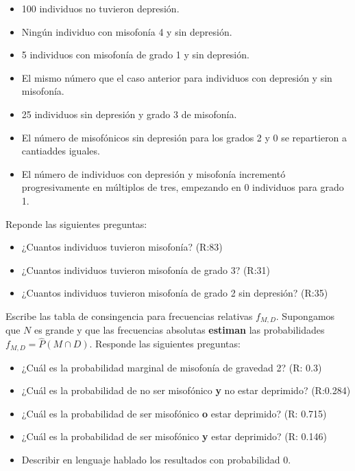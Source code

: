 \documentclass[
]{book}
\providecommand{\tightlist}{%
  \setlength{\itemsep}{0pt}\setlength{\parskip}{0pt}}
\begin{document}
\begin{itemize}
\tightlist
\item
  100 individuos no tuvieron depresión.
\item
  Ningún individuo con misofonía 4 y sin depresión.
\item
  5 individuos con misofonía de grado 1 y sin depresión.
\item
  El mismo número que el caso anterior para individuos con depresión y sin misofonía.
\item
  25 individuos sin depresión y grado 3 de misofonía.
\item
  El número de misofónicos sin depresión para los grados 2 y 0 se repartieron a cantiaddes iguales.
\item
  El número de individuos con depresión y misofonía incrementó progresivamente
  en múltiplos de tres, empezando en 0 individuos para grado 1.
\end{itemize}

Reponde las siguientes preguntas:

\begin{itemize}
\tightlist
\item
  ¿Cuantos individuos tuvieron misofonía? (R:83)
\item
  ¿Cuantos individuos tuvieron misofonía de grado 3? (R:31)
\item
  ¿Cuantos individuos tuvieron misofonía de grado 2 sin depresión? (R:35)
\end{itemize}

Escribe las tabla de consingencia para frecuencias relativas \(f_{M,D}\). Supongamos que \(N\) es grande y que las frecuencias absolutas \textbf{estiman} las probabilidades \(f_{M,D}=\hat{P}(M \cap D)\). Responde las siguientes preguntas:

\begin{itemize}
\tightlist
\item
  ¿Cuál es la probabilidad marginal de misofonía de gravedad 2? (R: 0.3)
\item
  ¿Cuál es la probabilidad de no ser misofónico \textbf{y} no estar deprimido? (R:0.284)
\item
  ¿Cuál es la probabilidad de ser misofónico \textbf{o} estar deprimido? (R: 0.715)
\item
  ¿Cuál es la probabilidad de ser misofónico \textbf{y} estar deprimido? (R: 0.146)
\item
  Describir en lenguaje hablado los resultados con probabilidad 0.
\end{itemize}
\end{document}
